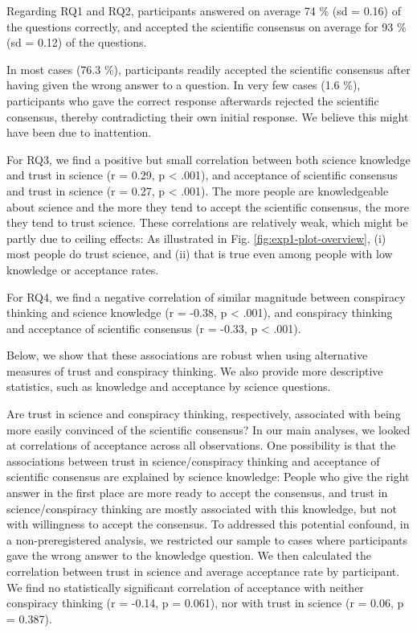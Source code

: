 \documentclass[
  doc,floatsintext]{apa6}
\begin{document}
Regarding RQ1 and RQ2, participants answered on average 74 \% (sd = 0.16) of the questions correctly, and accepted the scientific consensus on average for 93 \% (sd = 0.12) of the questions.

In most cases (76.3 \%), participants readily accepted the scientific consensus after having given the wrong answer to a question. In very few cases (1.6 \%), participants who gave the correct response afterwards rejected the scientific consensus, thereby contradicting their own initial response. We believe this might have been due to inattention.

For RQ3, we find a positive but small correlation between both science knowledge and trust in science (r = 0.29, p \textless{} .001), and acceptance of scientific consensus and trust in science (r = 0.27, p \textless{} .001). The more people are knowledgeable about science and the more they tend to accept the scientific consensus, the more they tend to trust science. These correlations are relatively weak, which might be partly due to ceiling effects: As illustrated in Fig. \ref{fig:exp1-plot-overview}, (i) most people do trust science, and (ii) that is true even among people with low knowledge or acceptance rates.

For RQ4, we find a negative correlation of similar magnitude between conspiracy thinking and science knowledge (r = -0.38, p \textless{} .001), and conspiracy thinking and acceptance of scientific consensus (r = -0.33, p \textless{} .001).

Below, we show that these associations are robust when using alternative measures of trust and conspiracy thinking. We also provide more descriptive statistics, such as knowledge and acceptance by science questions.

Are trust in science and conspiracy thinking, respectively, associated with being more easily convinced of the scientific consensus? In our main analyses, we looked at correlations of acceptance across all observations. One possibility is that the associations between trust in science/conspiracy thinking and acceptance of scientific consensus are explained by science knowledge: People who give the right answer in the first place are more ready to accept the consensus, and trust in science/conspiracy thinking are mostly associated with this knowledge, but not with willingness to accept the consensus. To addressed this potential confound, in a non-preregistered analysis, we restricted our sample to cases where participants gave the wrong answer to the knowledge question. We then calculated the correlation between trust in science and average acceptance rate by participant. We find no statistically significant correlation of acceptance with neither conspiracy thinking (r = -0.14, p = 0.061), nor with trust in science (r = 0.06, p = 0.387).
\end{document}
